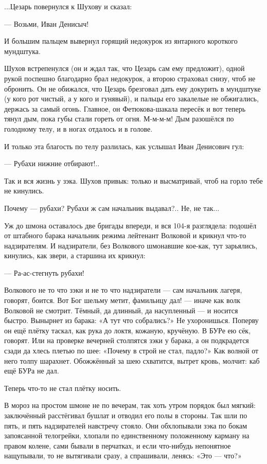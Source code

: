 ...Цезарь повернулся к Шухову и сказал:

--- Возьми, Иван Денисыч!

И большим пальцем вывернул горящий недокурок из янтарного короткого мундштука.

Шухов встрепенулся (он и ждал так, что Цезарь сам ему предложит), одной рукой поспешно
благодарно брал недокурок, а второю страховал снизу, чтоб не обронить. Он не обижался, что
Цезарь брезговал дать ему докурить в мундштуке (у кого рот чистый, а у кого и гунявый), и
пальцы его закалелые не обжигались, держась за самый огонь. Главное, он Фетюкова-шакала
пересёк и вот теперь тянул дым, пока губы стали гореть от огня. М-м-м-м! Дым разошёлся по
голодному телу, и в ногах отдалось и в голове.

И только эта благость по телу разлилась, как услышал Иван Денисович гул:

--- Рубахи нижние отбирают!..

Так и вся жизнь у зэка. Шухов привык: только и высматривай, чтоб на горло тебе не кинулись.

Почему --- рубахи? Рубахи ж сам начальник выдавал?.. Не, не так...

Уж до шмона оставалось две бригады впереди, и вся 104-я разглядела: подошёл от штабного барака
начальник режима лейтенант Волковой и крикнул что-то надзирателям. И надзиратели, без
Волкового шмонавшие кое-как, тут зарьялись, кинулись, как звери, а старшина их крикнул:

--- Ра-ас-стегнуть рубахи!

Волкового не то что зэки и не то что надзиратели --- сам начальник лагеря, говорят, боится. Вот
Бог шельму метит, фамильицу дал! --- иначе как волк Волковой не смотрит. Тёмный, да длинный, да
насупленный --- и носится быстро. Вынырнет из барака: «А тут что собрались?» Не ухоронишься.
Поперву он ещё плётку таскал, как рука до локтя, кожаную, кручёную. В БУРе ею сёк, говорят. Или
на проверке вечерней столпятся зэки у барака, а он подкрадется сзади да хлесь плетью по шее:
«Почему в строй не стал, падло?» Как волной от него толпу шарахнет. Обожжённый за шею
схватится, вытрет кровь, молчит: каб ещё БУРа не дал.

Теперь что-то не стал плётку носить.

В мороз на простом шмоне не по вечерам, так хоть утром порядок был мягкий: заключённый
расстёгивал бушлат и отводил его полы в стороны. Так шли по пять, и пять надзирателей
навстречу стояло. Они обхлопывали зэка по бокам запоясанной телогрейки, хлопали по
единственному положенному карману на правом колене, сами бывали в перчатках, и если
что-нибудь непонятное нащупывали, то не вытягивали сразу, а спрашивали, ленясь: «Это --- что?»

